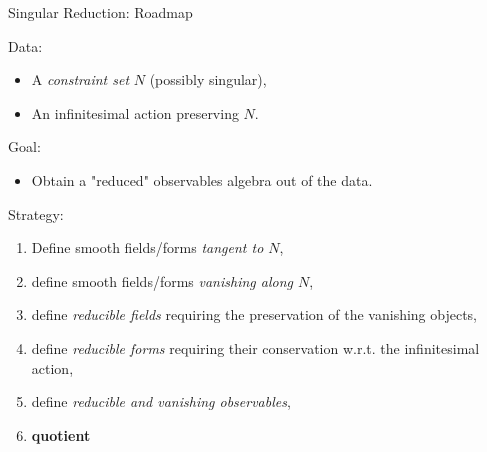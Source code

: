 \documentclass[handout,10pt]{beamer}
\begin{document}
\begin{frame}{Singular Reduction: Roadmap}
	\begin{block}{Data:}
			\begin{itemize}
				\item A \emph{constraint set} $N$ (possibly singular),
				\item An infinitesimal action preserving $N$.
			\end{itemize}
	\end{block}
	\vfill
	\pause
	\begin{block}{Goal:}
		\begin{itemize}
			\item Obtain a "reduced" observables algebra out of the data.
		\end{itemize}
	\end{block}
	\vfill
	\pause
	\begin{block}{Strategy:}
		\begin{enumerate}
			\item Define smooth fields/forms \emph{tangent to $N$},
			\item define smooth fields/forms \emph{vanishing along $N$},
			\item define \emph{reducible fields} requiring the preservation of the vanishing objects,
			\item define \emph{reducible forms} requiring their conservation w.r.t. the infinitesimal action,
			\item define \emph{reducible and vanishing observables},
			\item \textbf{quotient}
		\end{enumerate}
	\end{block}






\end{frame}

\end{document}
